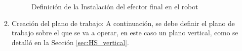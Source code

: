 \begin{enumerate}
    \begin{figure}[H]
      \begin{center}
        \subcapcentertrue
        \hspace{4mm}
      \end{center}
      \caption{Definición de la Instalación del efector final en el robot}
      \label{fig:Config_UR}
    \end{figure}
    
  \pagebreak
  \item Creación del plano de trabajo: A continuación, se debe definir el plano de trabajo sobre el que se va a operar, en este caso un plano vertical, como se detalló en la Sección \ref{sec:HS_vertical}. 
  

\end{enumerate}
